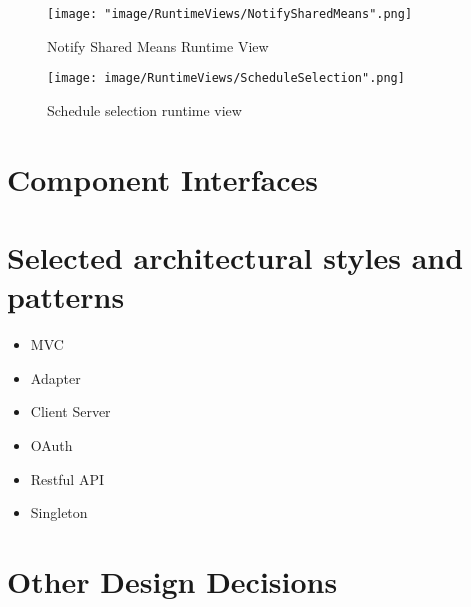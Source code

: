 \begin{figure}[H]
\begin{center}
\texttt{[image: "image/RuntimeViews/NotifySharedMeans".png]}
\caption{Notify Shared Means Runtime View}
\end{center}
\end{figure}


\begin{figure}[H]
\begin{center}
\texttt{[image: image/RuntimeViews/ScheduleSelection".png]}
\caption{Schedule selection runtime view}
\end{center}
\end{figure}

\section{Component Interfaces}

\section{Selected architectural styles and patterns}
\begin{itemize}
\item MVC
\item Adapter
\item Client Server
\item OAuth
\item Restful API
\item Singleton
\end{itemize}

\section{Other Design Decisions}